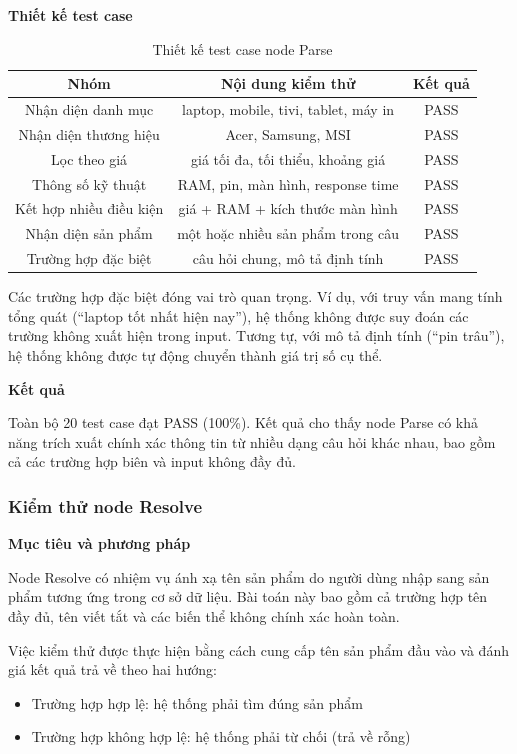\textbf{Thiết kế test case}

\begin{table}[h]
\centering
\small
\begin{tabular}{|c|c|c|}
\hline
Nhóm & Nội dung kiểm thử & Kết quả \\
\hline
Nhận diện danh mục & laptop, mobile, tivi, tablet, máy in & PASS \\
Nhận diện thương hiệu & Acer, Samsung, MSI & PASS \\
Lọc theo giá & giá tối đa, tối thiểu, khoảng giá & PASS \\
Thông số kỹ thuật & RAM, pin, màn hình, response time & PASS \\
Kết hợp nhiều điều kiện & giá + RAM + kích thước màn hình & PASS \\
Nhận diện sản phẩm & một hoặc nhiều sản phẩm trong câu & PASS \\
Trường hợp đặc biệt & câu hỏi chung, mô tả định tính & PASS \\
\hline
\end{tabular}
\caption{Thiết kế test case node Parse}
\end{table}

Các trường hợp đặc biệt đóng vai trò quan trọng. Ví dụ, với truy vấn mang tính tổng quát (“laptop tốt nhất hiện nay”), hệ thống không được suy đoán các trường không xuất hiện trong input. Tương tự, với mô tả định tính (“pin trâu”), hệ thống không được tự động chuyển thành giá trị số cụ thể.

\textbf{Kết quả}

Toàn bộ 20 test case đạt PASS (100\%). Kết quả cho thấy node Parse có khả năng trích xuất chính xác thông tin từ nhiều dạng câu hỏi khác nhau, bao gồm cả các trường hợp biên và input không đầy đủ.

\subsubsection{Kiểm thử node Resolve}

\textbf{Mục tiêu và phương pháp}

Node Resolve có nhiệm vụ ánh xạ tên sản phẩm do người dùng nhập sang sản phẩm tương ứng trong cơ sở dữ liệu. Bài toán này bao gồm cả trường hợp tên đầy đủ, tên viết tắt và các biến thể không chính xác hoàn toàn.

Việc kiểm thử được thực hiện bằng cách cung cấp tên sản phẩm đầu vào và đánh giá kết quả trả về theo hai hướng:

\begin{itemize}
\item Trường hợp hợp lệ: hệ thống phải tìm đúng sản phẩm
\item Trường hợp không hợp lệ: hệ thống phải từ chối (trả về rỗng)
\end{itemize}


